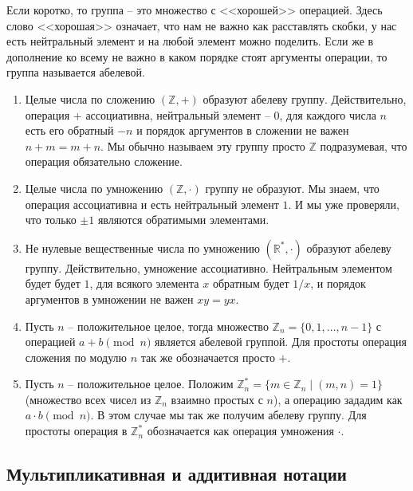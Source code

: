 Если коротко, то группа -- это множество с <<хорошей>> операцией.
Здесь слово <<хорошая>> означает, что нам не важно как расставлять скобки, у нас есть нейтральный элемент и на любой элемент можно поделить.
Если же в дополнение ко всему не важно в каком порядке стоят аргументы операции, то группа называется абелевой.

\begin{examples}
\begin{enumerate}
\item Целые числа по сложению $(\mathbb Z, +)$ образуют абелеву группу.
Действительно, операция $+$ ассоциативна, нейтральный элемент -- $0$, для каждого числа $n$ есть его обратный $-n$ и порядок аргументов в сложении не важен $n + m = m + n$.
Мы обычно называем эту группу просто $\mathbb Z$ подразумевая, что операция обязательно сложение.

\item Целые числа по умножению $(\mathbb Z, \cdot)$ группу не образуют.
Мы знаем, что операция ассоциативна и есть нейтральный элемент $1$.
И мы уже проверяли, что только $\pm 1$ являются обратимыми элементами.

\item Не нулевые вещественные числа по умножению $(\mathbb  R^*, \cdot)$ образуют абелеву группу.
Действительно, умножение ассоциативно.
Нейтральным элементом будет будет $1$, для всякого элемента $x$ обратным будет $1/x$, и порядок аргументов в умножении не важен $xy = yx$.

\item Пусть $n$ -- положительное целое, тогда множество $\mathbb Z_n = \{0,1, \ldots, n-1\}$ с операцией $a + b \pmod n$ является абелевой группой.
Для простоты операция сложения по модулю $n$ так же обозначается просто $+$.

\item Пусть $n$ -- положительное целое.
Положим $\mathbb Z_n^* = \{m\in \mathbb Z_n \mid (m,n) = 1\}$ (множество всех чисел из $\mathbb Z_n$ взаимно простых с $n$), а операцию зададим как $a \cdot b \pmod n$.
В этом случае мы так же получим абелеву группу.
Для простоты операция в $\mathbb Z_n^*$ обозначается как операция умножения $\cdot$.

\end{enumerate}
\end{examples}

\subsection{Мультипликативная и аддитивная нотации}

